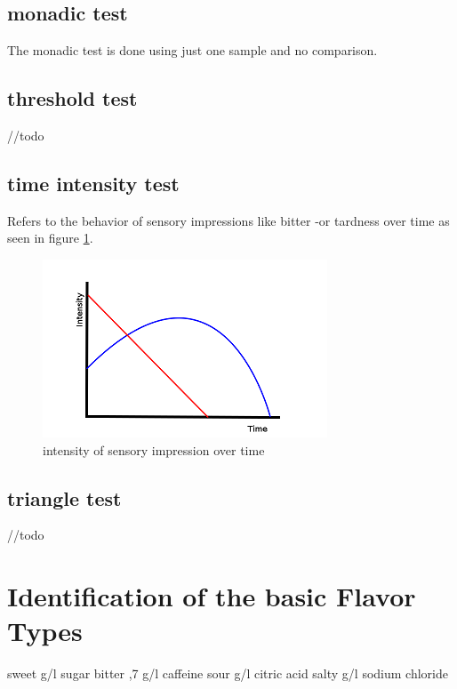 \documentclass[]{scrartcl}
\begin{document}
\subsection{monadic test}
The monadic test is done using just one sample and no comparison.

\subsection{threshold test}
//todo

\subsection{time intensity test}
Refers to the behavior of sensory impressions like bitter -or tardness over time
as seen in figure \ref{fig:time-intensity}.
\begin{figure}[h]
	\centering
	\includegraphics{time-intensity.png}
	\caption{intensity of sensory impression over time}
	\label{fig:time-intensity}
\end{figure}

\subsection{triangle test}
//todo


\section{Identification of the basic Flavor Types}
sweet  g/l sugar \newline
bitter ,7 g/l caffeine \newline
sour  g/l citric acid \newline
salty  g/l sodium chloride \newline
\end{document}

